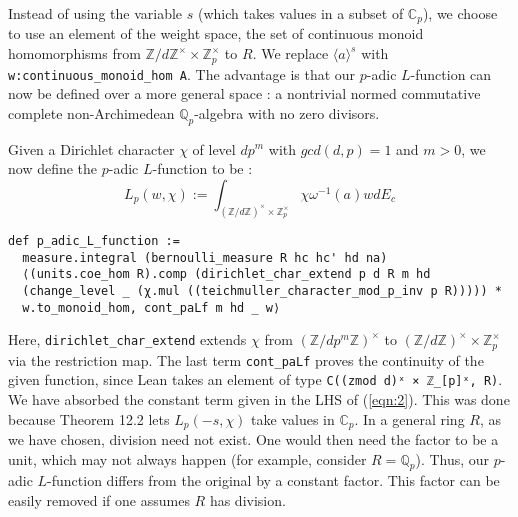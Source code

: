 \documentclass[a4paper,UKenglish,cleveref, autoref, thm-restate,pdfa]{lipics-v2021}
\newcommand{\lean}[1]{\texttt{#1}\xspace} %
\begin{document}
Instead of using the variable $s$ (which takes values in a subset of $\mathbb{C}_p$), we choose to use an element of the weight space, 
the set of continuous monoid homomorphisms from $\mathbb{Z}/d\mathbb{Z}^{\times} \times \mathbb{Z}_p^{\times}$ to $R$. We replace
$\langle a \rangle ^s$ with \lean{w:continuous\_monoid\_hom A}. The advantage is that our $p$-adic $L$-function can now be defined over a more general space : 
a nontrivial normed commutative complete non-Archimedean $\mathbb{Q}_p$-algebra with no zero divisors. 

Given a Dirichlet character $\chi$ of level $dp^m$ with $gcd(d, p) = 1$ and $m > 0$,
we now define the $p$-adic $L$-function to be : %
$$ L_p(w, \chi) := \int_{(\mathbb{Z}/d \mathbb{Z})^{\times} \times \mathbb{Z}_p^{\times}}
\chi \omega^{-1}(a) w dE_c $$
\begin{lstlisting}
def p_adic_L_function := 
  measure.integral (bernoulli_measure R hc hc' hd na)
  ⟨(units.coe_hom R).comp (dirichlet_char_extend p d R m hd 
  (change_level _ (χ.mul ((teichmuller_character_mod_p_inv p R))))) * 
  w.to_monoid_hom, cont_paLf m hd _ w⟩
\end{lstlisting}
Here, \lean{dirichlet\_char\_extend} extends $\chi$ from $(\mathbb{Z}/ dp^m \mathbb{Z})^{\times}$ to 
$(\mathbb{Z}/ d \mathbb{Z})^{\times} \times \mathbb{Z}_p^{\times}$ via the restriction map. The last term 
\lean{cont\_paLf} proves the continuity of the given function, since Lean takes an element of type \lean{C((zmod d)ˣ × ℤ\_[p]ˣ, R)}. 
We have absorbed the constant term given in the LHS of (\ref{eqn:2}). This was done because Theorem 12.2 
lets $L_p(-s, \chi)$ take values in $\mathbb{C}_p$. 
In a general ring $R$, as we have chosen, division need not exist. One would then need the factor to be a unit, which may not always happen 
(for example, consider $R = \mathbb{Q}_p$). Thus, our $p$-adic $L$-function differs from the original by a constant factor. 
This factor can be easily removed if one assumes $R$ has division. 

\end{document}
